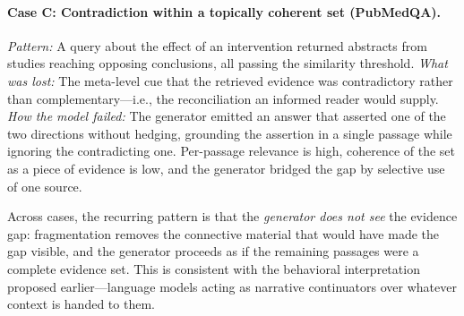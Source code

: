 \paragraph{Case C: Contradiction within a topically coherent set (PubMedQA).}
\emph{Pattern:} A query about the effect of an intervention returned
abstracts from studies reaching opposing conclusions, all passing the
similarity threshold.
\emph{What was lost:} The meta-level cue that the retrieved evidence was
contradictory rather than complementary---i.e., the reconciliation an
informed reader would supply.
\emph{How the model failed:} The generator emitted an answer that asserted
one of the two directions without hedging, grounding the assertion in a
single passage while ignoring the contradicting one. Per-passage relevance
is high, coherence of the set as a piece of evidence is low, and the
generator bridged the gap by selective use of one source.

Across cases, the recurring pattern is that the \emph{generator does not
see} the evidence gap: fragmentation removes the connective material that
would have made the gap visible, and the generator proceeds as if the
remaining passages were a complete evidence set. This is consistent with
the behavioral interpretation proposed earlier---language models acting
as narrative continuators over whatever context is handed to them.

